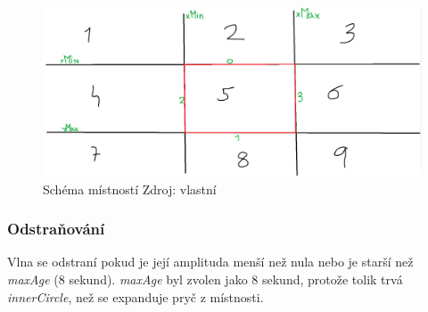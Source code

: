 \begin{figure}[htpb]
    \centering
    \includegraphics[width=0.7\linewidth]{Obrazky/Schema mistnosti.png}
    \caption{Schéma místností Zdroj: vlastní}
    \label{fig:enter-label}
\end{figure}


\subsubsection{Odstraňování}
Vlna se odstraní pokud je její amplituda menší než nula nebo je starší než \textit{maxAge} (8 sekund). \textit{maxAge} byl zvolen jako 8 sekund, protože tolik trvá \textit{innerCircle},  než se expanduje pryč z místnosti.

